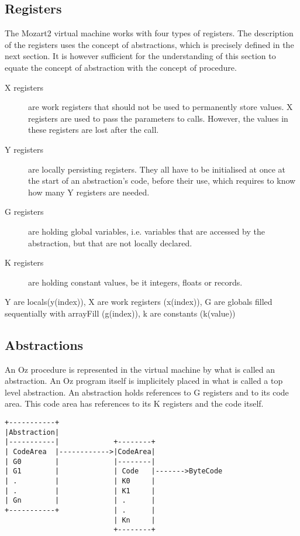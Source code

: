 \documentclass[a4paper]{memoir}
\begin{document}
\subsection{Registers}
The Mozart2 virtual machine works with four types of registers. The description of the registers uses the concept of abstractions, which is precisely defined in the next section. It is however sufficient for the understanding of this section to equate the concept of abstraction with the concept of procedure.
\begin{description}
  \item[X registers]are work registers that should not be used to permanently store values. X registers are used to pass the parameters to calls. However, the values in these registers are lost after the call.
  \item[Y registers]are locally persisting registers. They all have to be initialised at once at the start of an abstraction's code, before their use, which requires to know how many Y registers are needed.
  \item[G registers] are holding global variables, i.e. variables that are accessed by the abstraction, but that are not locally declared.
  \item[K registers] are holding constant values, be it integers, floats or records.
\end{description}

Y are locals(y(index)), X are work registers (x(index)), G are globals filled sequentially with arrayFill (g(index)), k are constants (k(value))
\subsection{Abstractions}
An Oz procedure is represented in the virtual machine by what is called an abstraction. An Oz program itself is implicitely placed in what is called a top level abstraction.
An abstraction holds references to G registers and to its code area. This code area has references to its K registers and the code itself. 
\begin{verbatim}
+-----------+
|Abstraction|
|-----------|             +--------+
| CodeArea  |------------>|CodeArea|
| G0        |             |--------|
| G1        |             | Code   |------->ByteCode
| .         |             | K0     |
| .         |             | K1     |
| Gn        |             | .      |
+-----------+             | .      |
                          | Kn     |
                          +--------+
\end{verbatim}
\end{document}

